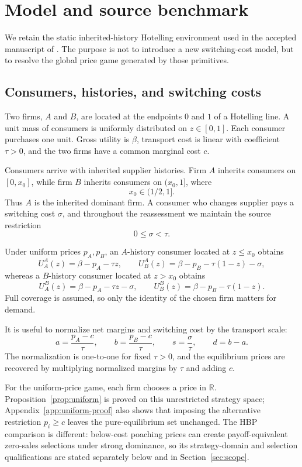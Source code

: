 \section{Model and source benchmark}
\label{sec:model}

We retain the static inherited-history Hotelling environment used in the accepted manuscript of \citet{GehrigShyStenbacka2012}. The purpose is not to introduce a new switching-cost model, but to resolve the global price game generated by those primitives.

\subsection{Consumers, histories, and switching costs}

Two firms, \(A\) and \(B\), are located at the endpoints \(0\) and \(1\) of a Hotelling line. A unit mass of consumers is uniformly distributed on \(z\in[0,1]\). Each consumer purchases one unit. Gross utility is \(\beta\), transport cost is linear with coefficient \(\tau>0\), and the two firms have a common marginal cost \(c\).

Consumers arrive with inherited supplier histories. Firm \(A\) inherits consumers on \([0,x_0]\), while firm \(B\) inherits consumers on \((x_0,1]\), where
\[
x_0\in(1/2,1].
\]
Thus \(A\) is the inherited dominant firm. A consumer who changes supplier pays a switching cost \(\sigma\), and throughout the reassessment we maintain the source restriction
\[
0\le \sigma<\tau.
\]

Under uniform prices \(p_A,p_B\), an \(A\)-history consumer located at \(z\le x_0\) obtains
\[
U_A^A(z)=\beta-p_A-\tau z,
\qquad
U_B^A(z)=\beta-p_B-\tau(1-z)-\sigma,
\]
whereas a \(B\)-history consumer located at \(z>x_0\) obtains
\[
U_A^B(z)=\beta-p_A-\tau z-\sigma,
\qquad
U_B^B(z)=\beta-p_B-\tau(1-z).
\]
Full coverage is assumed, so only the identity of the chosen firm matters for demand.

It is useful to normalize net margins and switching cost by the transport scale:
\[
a=\frac{p_A-c}{\tau},\qquad
b=\frac{p_B-c}{\tau},\qquad
s=\frac{\sigma}{\tau},\qquad
d=b-a.
\]
The normalization is one-to-one for fixed \(\tau>0\), and the equilibrium prices are recovered by multiplying normalized margins by \(\tau\) and adding \(c\).

For the uniform-price game, each firm chooses a price in \(\mathbb R\). Proposition~\ref{prop:uniform} is proved on this unrestricted strategy space; Appendix~\ref{app:uniform-proof} also shows that imposing the alternative restriction \(p_i\ge c\) leaves the pure-equilibrium set unchanged. The HBP comparison is different: below-cost poaching prices can create payoff-equivalent zero-sales selections under strong dominance, so its strategy-domain and selection qualifications are stated separately below and in Section~\ref{sec:scope}.


